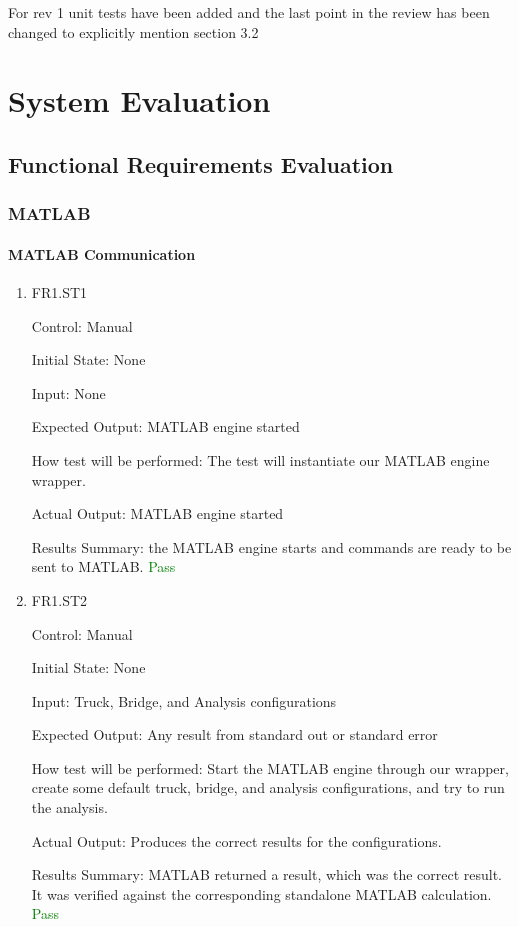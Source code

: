 \documentclass[12pt, titlepage]{article}
\begin{document}
For rev 1 unit tests have been added and the last point in the review has been changed to explicitly mention section 3.2


\section{System Evaluation}

\subsection{Functional Requirements Evaluation}

\subsubsection{MATLAB}

\paragraph{MATLAB Communication}

\begin{enumerate}

  \item{FR1.ST1\\}

  Control: Manual

  Initial State: None

  Input: None

  Expected Output: MATLAB engine started

  How test will be performed: The test will instantiate our MATLAB engine wrapper.

  Actual Output: MATLAB engine started

  Results Summary: the MATLAB engine starts and commands are ready to be sent to MATLAB. \textcolor{green} {Pass}  

  \item{FR1.ST2\\}

  Control: Manual

  Initial State: None

  Input: Truck, Bridge, and Analysis configurations

  Expected Output: Any result from standard out or standard error

  How test will be performed: Start the MATLAB engine through our wrapper, create
  some default truck, bridge, and analysis configurations, and try to run the analysis.

  Actual Output: Produces the correct results for the configurations.

  Results Summary: MATLAB returned a result, which was the correct result. It was verified 
  against the corresponding standalone MATLAB calculation. \textcolor{green} {Pass}

\end{enumerate}
\end{document}
